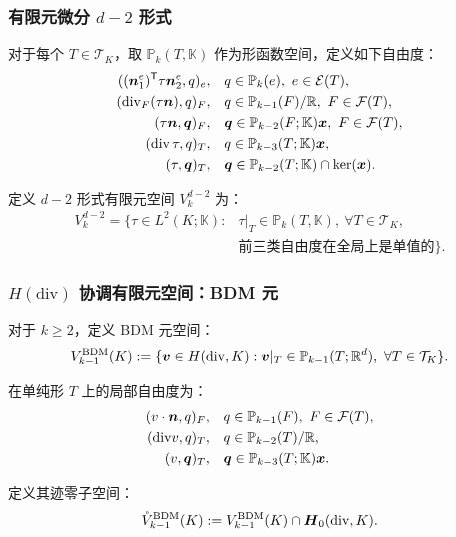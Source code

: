 \documentclass[notheorems,serif]{beamer}
\begin{document}
\begin{frame}
    \frametitle{有限元微分 $d-2$ 形式}
对于每个 $T \in \mathcal{T}_K$，取 $\mathbb{P}_k(T, \mathbb{K})$ 作为形函数空间，定义如下自由度：
$$
\begin{aligned}
((\boldsymbol{n}_{1}^{e})^{\mathsf{T}}\tau\boldsymbol{n}_{2}^{e},q)_{e}, & \quad q\in\mathbb{P}_{k}(e),\ e\in\mathcal{E}(T), \\
(\mathrm{div}_{F}(\tau\boldsymbol{n}),q)_{F}, & \quad q\in\mathbb{P}_{k-1}(F)/\mathbb{R},\ F\in\mathcal{F}(T), \\
(\tau\boldsymbol{n},\boldsymbol{q})_F, & \quad \boldsymbol{q}\in\mathbb{P}_{k-2}(F;\mathbb{K})\boldsymbol{x},\ F\in\mathcal{F}(T), \\
(\operatorname{div}\tau,q)_{T}, & \quad q\in\mathbb{P}_{k-3}(T;\mathbb{K})\boldsymbol{x}, \\
(\tau,\boldsymbol{q})_{T}, & \quad \boldsymbol{q}\in\mathbb{P}_{k-2}(T;\mathbb{K})\cap\ker(\boldsymbol{x}).
\end{aligned}
$$

定义 $d-2$ 形式有限元空间 $V^{d-2}_k$ 为：
$$
\begin{aligned}
V^{d-2}_k = \{\tau \in L^2(K; \mathbb{K}) : & \tau|_T \in \mathbb{P}_k(T, \mathbb{K}),\ \forall T \in \mathcal{T}_K, \\
& \text{前三类自由度在全局上是单值的} \}.
\end{aligned}
$$

\end{frame}

\begin{frame}
    \frametitle{$H(\mathrm{div})$ 协调有限元空间：BDM 元}
对于 $k \geq 2$，定义 BDM 元空间：
$$
V^{\mathrm{BDM}}_{k-1}(K) := \{\boldsymbol{v} \in H(\mathrm{div}, K) : \boldsymbol{v}|_T \in
\mathbb{P}_{k-1}(T; \mathbb{R}^d),\ \forall T \in \mathcal{T}_K\}.
$$

在单纯形 $T$ 上的局部自由度为：
$$
\begin{aligned}
(v\cdot\bsn,q)_{F}, & \quad q\in\mathbb{P}_{k-1}(F),\ F\in\mathcal{F}(T), \\
(\diver v, q)_{T}, & \quad q\in\mathbb{P}_{k-2}(T)/\mathbb{R}, \\
(v, \bsq)_T, & \quad \bsq\in\mathbb{P}_{k-3}(T;\mathbb{K})\bsx.
\end{aligned}
$$

定义其迹零子空间：
$$
\mathring{V}_{k-1}^{\mathrm{BDM}}(K):=V_{k-1}^{\mathrm{BDM}}(K)\cap\boldsymbol{H}_{0}(\mathrm{div},K).
$$
\end{frame}
\end{document}

